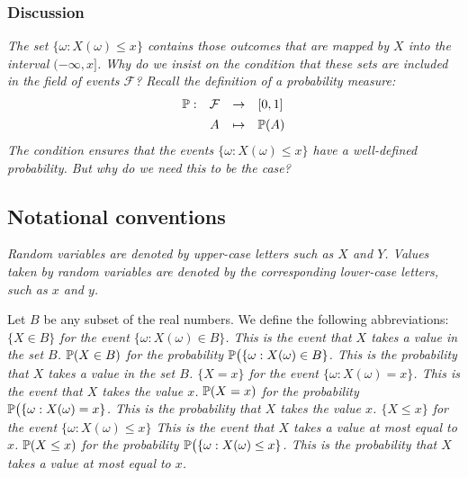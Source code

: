 \subsubsection*{Discussion}
\bit
\it The set $\{\omega:X(\omega)\leq x\}$ contains those outcomes that are mapped by $X$ into the interval $(-\infty, x]$.
\it Why do we insist on the condition that these sets are included in the field of events $\mathcal{F}$?
\it Recall the definition of a probability measure:
\[
\begin{array}{rccl}
	\mathbb{P}:	& \mathcal{F}	& \to	& [0,1] \\[1ex]
			& A				& \mapsto	& \mathbb{P}(A)
\end{array}
\]
\it The condition ensures that the events $\{\omega:X(\omega)\leq x\}$ have a well-defined probability.
\it But why do we need this to be the case? 
\eit

\subsection{Notational conventions}
\bit
\it Random variables are denoted by upper-case letters such as $X$ and $Y$.
\it Values taken by random variables are denoted by the corresponding lower-case letters, such as $x$ and $y$.
\eit

Let $B$ be any subset of the real numbers. We define the following abbreviations:
\ben
\it $\{X\in B\}$ for the event $\{\omega: X(\omega) \in B\}$.
	\bit
	\it This is the event that $X$ takes a value in the set $B$.
	\eit
\it $\mathbb{P}(X\in B)$ for the probability $\mathbb{P}\big(\{\omega: X(\omega) \in B\}$.
	\bit
	\it This is the probability that $X$ takes a value in the set $B$.
	\eit
\it $\{X = x\}$ for the event $\{\omega:X(\omega)=x\}$.
	\bit
	\it This is the event that $X$ takes the value $x$.
	\eit
\it $\mathbb{P}(X = x)$ for the probability $\mathbb{P}\big(\{\omega: X(\omega) = x\}$.
	\bit
	\it This is the probability that $X$ takes the value $x$.
	\eit
\it $\{X\leq x\}$ for the event $\{\omega:X(\omega)\leq x\}$
	\bit
	\it This is the event that $X$ takes a value at most equal to $x$.
	\eit
\it $\mathbb{P}(X \leq x)$ for the probability $\mathbb{P}\big(\{\omega: X(\omega) \leq x\}$.
	\bit
	\it This is the probability that $X$ takes a value at most equal to $x$.
	\eit
\een

